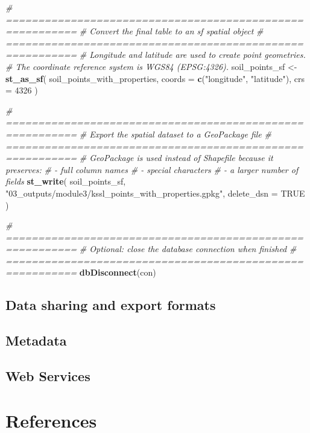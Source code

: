 \documentclass[
  10pt,
  b5paper,
  oneside]{book}
\newenvironment{Shaded}{\begin{snugshade}}{\end{snugshade}}
\newcommand{\AttributeTok}[1]{\textcolor[rgb]{0.13,0.29,0.53}{#1}}
\newcommand{\CommentTok}[1]{\textcolor[rgb]{0.56,0.35,0.01}{\textit{#1}}}
\newcommand{\ConstantTok}[1]{\textcolor[rgb]{0.56,0.35,0.01}{#1}}
\newcommand{\DecValTok}[1]{\textcolor[rgb]{0.00,0.00,0.81}{#1}}
\newcommand{\FunctionTok}[1]{\textcolor[rgb]{0.13,0.29,0.53}{\textbf{#1}}}
\newcommand{\NormalTok}[1]{#1}
\newcommand{\OtherTok}[1]{\textcolor[rgb]{0.56,0.35,0.01}{#1}}
\newcommand{\StringTok}[1]{\textcolor[rgb]{0.31,0.60,0.02}{#1}}
\begin{document}
\begin{Shaded}
\begin{Highlighting}[]
\CommentTok{\# =========================================================}
\CommentTok{\# Convert the final table to an sf spatial object}
\CommentTok{\# =========================================================}
\CommentTok{\# Longitude and latitude are used to create point geometries.}
\CommentTok{\# The coordinate reference system is WGS84 (EPSG:4326).}
\NormalTok{soil\_points\_sf }\OtherTok{\textless{}{-}} \FunctionTok{st\_as\_sf}\NormalTok{(}
\NormalTok{  soil\_points\_with\_properties,}
  \AttributeTok{coords =} \FunctionTok{c}\NormalTok{(}\StringTok{"longitude"}\NormalTok{, }\StringTok{"latitude"}\NormalTok{),}
  \AttributeTok{crs =} \DecValTok{4326}
\NormalTok{)}

\CommentTok{\# =========================================================}
\CommentTok{\# Export the spatial dataset to a GeoPackage file}
\CommentTok{\# =========================================================}
\CommentTok{\# GeoPackage is used instead of Shapefile because it preserves:}
\CommentTok{\# {-} full column names}
\CommentTok{\# {-} special characters}
\CommentTok{\# {-} a larger number of fields}
\FunctionTok{st\_write}\NormalTok{(}
\NormalTok{  soil\_points\_sf,}
  \StringTok{"03\_outputs/module3/kssl\_points\_with\_properties.gpkg"}\NormalTok{,}
  \AttributeTok{delete\_dsn =} \ConstantTok{TRUE}
\NormalTok{)}

\CommentTok{\# =========================================================}
\CommentTok{\# Optional: close the database connection when finished}
\CommentTok{\# =========================================================}
\FunctionTok{dbDisconnect}\NormalTok{(con)}
\end{Highlighting}
\end{Shaded}

\section{Data sharing and export formats}\label{data-sharing-and-export-formats}

\section{Metadata}\label{metadata-1}

\section{Web Services}\label{web-services}

\chapter*{References}\label{references-4}
\end{document}
